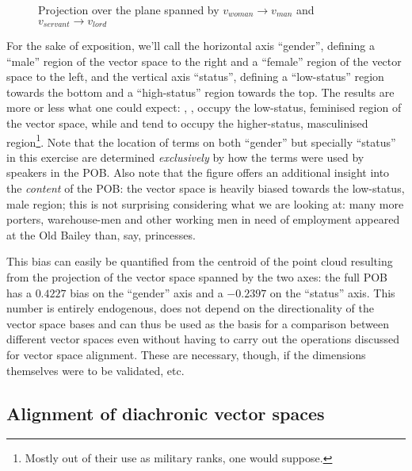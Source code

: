 \begin{figure}
    \centerfloat
    
    \caption[Projection over the plane spanned by $v_{woman} \rightarrow v_{man}$ and $v_{servant} \rightarrow v_{lord}$]{
        Projection over the plane spanned by $v_{woman} \rightarrow v_{man}$ and $v_{servant} \rightarrow v_{lord}$
    }
    \label{fig:glove_axes}
\end{figure}

For the sake of exposition, we'll call the horizontal axis ``gender'', defining a ``male'' region of the vector space to the right and a ``female'' region of the vector space to the left, and the vertical axis ``status'', defining a ``low-status'' region towards the bottom and a ``high-status'' region towards the top.
The results are more or less what one could expect: , ,  occupy the low-status, feminised region of the vector space, while  and  tend to occupy the higher-status, masculinised region\footnote{
    Mostly out of their use as military ranks, one would suppose.
}.
Note that the location of terms on both ``gender'' but specially ``status'' in this exercise are determined \emph{exclusively} by how the terms were used by speakers in the POB.
Also note that the figure offers an additional insight into the \emph{content} of the POB: the vector space is heavily biased towards the low-status, male region; this is not surprising considering what we are looking at: many more porters, warehouse-men and other working men in need of employment appeared at the Old Bailey than, say, princesses.

This bias can easily be quantified from the centroid of the point cloud resulting from the projection of the vector space spanned by the two axes: the full POB has a $0.4227$ bias on the ``gender'' axis and a $-0.2397$ on the ``status'' axis.
This number is entirely endogenous, does not depend on the directionality of the vector space bases and can thus be used as the basis for a comparison between different vector spaces even without having to carry out the operations discussed for vector space alignment.
These are necessary, though, if the dimensions themselves were to be validated, etc.

\subsection{Alignment of diachronic vector spaces}

